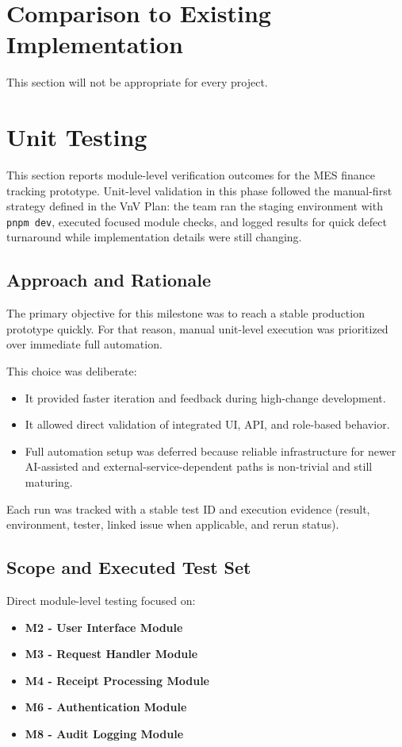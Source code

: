 \documentclass[12pt, titlepage]{article}
\begin{document}
\section{Comparison to Existing Implementation}	

This section will not be appropriate for every project.

\section{Unit Testing}

This section reports module-level verification outcomes for the MES finance
tracking prototype. Unit-level validation in this phase followed the
manual-first strategy defined in the VnV Plan: the team ran the staging
environment with \texttt{pnpm dev}, executed focused module checks, and logged
results for quick defect turnaround while implementation details were still
changing.

\subsection{Approach and Rationale}

The primary objective for this milestone was to reach a stable production
prototype quickly. For that reason, manual unit-level execution was prioritized
over immediate full automation.

This choice was deliberate:
\begin{itemize}
\item It provided faster iteration and feedback during high-change development.
\item It allowed direct validation of integrated UI, API, and role-based behavior.
\item Full automation setup was deferred because reliable infrastructure for newer
AI-assisted and external-service-dependent paths is non-trivial and still
maturing.
\end{itemize}

Each run was tracked with a stable test ID and execution evidence (result,
environment, tester, linked issue when applicable, and rerun status).

\subsection{Scope and Executed Test Set}

Direct module-level testing focused on:
\begin{itemize}
\item \textbf{M2 - User Interface Module}
\item \textbf{M3 - Request Handler Module}
\item \textbf{M4 - Receipt Processing Module}
\item \textbf{M6 - Authentication Module}
\item \textbf{M8 - Audit Logging Module}
\end{itemize}
\end{document}
